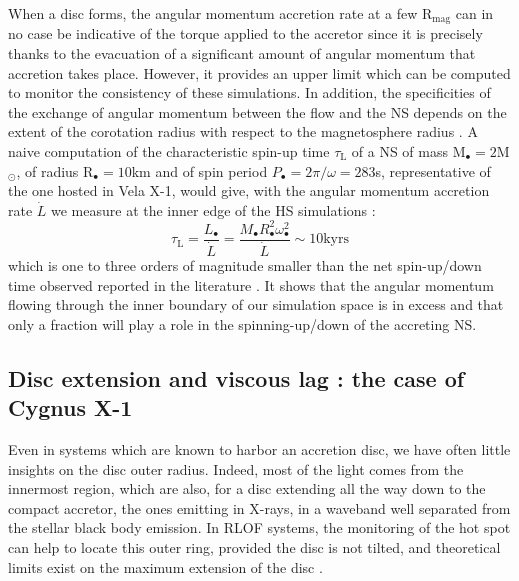 \documentclass{aa}
\makeatletter
\newcommand*{\rlof}{RLOF\@\xspace}
\newcommand*{\ns}{NS\@\xspace}
\newcommand*{\eg}{e.g.\@\xspace}
\makeatother
\begin{document}
When a disc forms, the angular momentum accretion rate at a few R$_{\text{mag}}$ can in no case be indicative of the torque applied to the accretor since it is precisely thanks to the evacuation of a significant amount of angular momentum that accretion takes place. However, it provides an upper limit which can be computed to monitor the consistency of these simulations. In addition, the specificities of the exchange of angular momentum between the flow and the \ns depends on the extent of the corotation radius with respect to the magnetosphere radius \citep{Ghosh1979}. A naive computation of the characteristic spin-up time $\tau_{\text{L}}$ of a \ns of mass M$_{\bullet}=2$M$_{\odot}$, of radius R$_{\bullet}=10$km and of spin period $P_{\bullet}=2\pi/\omega=283$s, representative of the one hosted in Vela X-1, would give, with the angular momentum accretion rate $\dot{L}$ we measure at the inner edge of the HS simulations :
\begin{equation}
\tau_{\text{L}}=\frac{L_{\bullet}}{\dot{L}}=\frac{M_{\bullet}R_{\bullet}^2\omega_{\bullet}^2}{\dot{L}}\sim 10\text{kyrs}
\end{equation}
which is one to three orders of magnitude smaller than the net spin-up/down time observed reported in the literature \citep[see \eg][]{Ziolkowski1985}. It shows that the angular momentum flowing through the inner boundary of our simulation space is in excess and that only a fraction will play a role in the spinning-up/down of the accreting \ns.

\subsection{Disc extension and viscous lag : the case of Cygnus X-1}
\label{sec:rout}

Even in systems which are known to harbor an accretion disc, we have often little insights on the disc outer radius. Indeed, most of the light comes from the innermost region, which are also, for a disc extending all the way down to the compact accretor, the ones emitting in X-rays, in a waveband well separated from the stellar black body emission. In \rlof systems, the monitoring of the hot spot can help to locate this outer ring, provided the disc is not tilted, and theoretical limits exist on the maximum extension of the disc \citep[$\sim$70\% of the Roche lobe radius of the accretor,][]{Paczynski1977}. 
\end{document}
